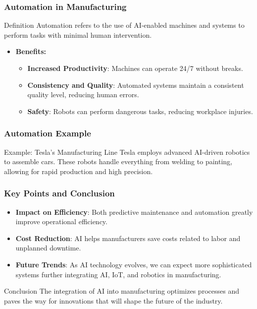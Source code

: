 \documentclass[aspectratio=169]{beamer}
\begin{document}
\begin{frame}[fragile]
    \frametitle{Automation in Manufacturing}
    \begin{block}{Definition}
        Automation refers to the use of AI-enabled machines and systems to perform tasks with minimal human intervention.
    \end{block}

    \begin{itemize}
        \item \textbf{Benefits:}
        \begin{itemize}
            \item \textbf{Increased Productivity}: Machines can operate 24/7 without breaks.
            \item \textbf{Consistency and Quality}: Automated systems maintain a consistent quality level, reducing human errors.
            \item \textbf{Safety}: Robots can perform dangerous tasks, reducing workplace injuries.
        \end{itemize}
    \end{itemize}
\end{frame}

\begin{frame}[fragile]
    \frametitle{Automation Example}
    \begin{block}{Example: Tesla’s Manufacturing Line}
        Tesla employs advanced AI-driven robotics to assemble cars. These robots handle everything from welding to painting, allowing for rapid production and high precision.
    \end{block}
\end{frame}

\begin{frame}[fragile]
    \frametitle{Key Points and Conclusion}
    \begin{itemize}
        \item \textbf{Impact on Efficiency}: Both predictive maintenance and automation greatly improve operational efficiency.
        \item \textbf{Cost Reduction}: AI helps manufacturers save costs related to labor and unplanned downtime.
        \item \textbf{Future Trends}: As AI technology evolves, we can expect more sophisticated systems further integrating AI, IoT, and robotics in manufacturing.
    \end{itemize}

    \begin{block}{Conclusion}
        The integration of AI into manufacturing optimizes processes and paves the way for innovations that will shape the future of the industry.
    \end{block}
\end{frame}
\end{document}

